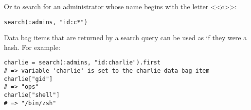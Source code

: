 Or to search for an administrator whose name begins with the letter <<c>>:

\begin{lstlisting}[label=lst:my-server-cloud-databag6]
search(:admins, "id:c*")
\end{lstlisting}

Data bag items that are returned by a search query can be used as if they were a hash. For example:

\begin{lstlisting}[label=lst:my-server-cloud-databag7]
charlie = search(:admins, "id:charlie").first
# => variable 'charlie' is set to the charlie data bag item
charlie["gid"]
# => "ops"
charlie["shell"]
# => "/bin/zsh"
\end{lstlisting}
